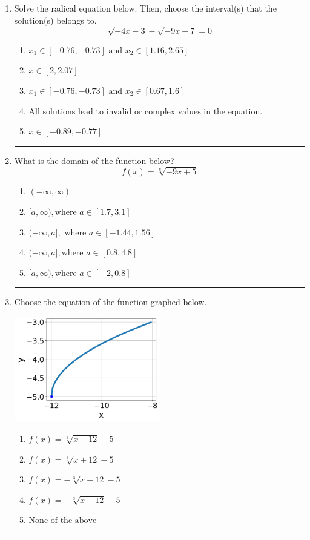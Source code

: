 \documentclass[14pt]{extbook}
\newcommand{\litem}[1]{\item#1\hspace*{-1cm}\rule{\textwidth}{0.4pt}}
\begin{document}
\begin{enumerate}
{\begin{enumerate}[label=\Alph*.]
\end{enumerate} }
\litem{
Solve the radical equation below. Then, choose the interval(s) that the solution(s) belongs to.\[ \sqrt{-4 x - 3} - \sqrt{-9 x + 7} = 0 \]\begin{enumerate}[label=\Alph*.]
\item \( x_1 \in [-0.76, -0.73] \text{ and } x_2 \in [1.16,2.65] \)
\item \( x \in [2,2.07] \)
\item \( x_1 \in [-0.76, -0.73] \text{ and } x_2 \in [0.67,1.6] \)
\item \( \text{All solutions lead to invalid or complex values in the equation.} \)
\item \( x \in [-0.89,-0.77] \)

\end{enumerate} }
\litem{
What is the domain of the function below?\[ f(x) = \sqrt[8]{-9 x + 5} \]\begin{enumerate}[label=\Alph*.]
\item \( (-\infty, \infty) \)
\item \( [a, \infty), \text{where } a \in [1.7, 3.1] \)
\item \( (-\infty, a], \text{ where } a \in [-1.44, 1.56] \)
\item \( (-\infty, a], \text{where } a \in [0.8, 4.8] \)
\item \( [a, \infty), \text{where } a \in [-2, 0.8] \)

\end{enumerate} }
\litem{
Choose the equation of the function graphed below.
\begin{center}
    \includegraphics[width=0.5\textwidth]{../Figures/radicalGraphToEquationCopyB.png}
\end{center}
\begin{enumerate}[label=\Alph*.]
\item \( f(x) = \sqrt[3]{x - 12} - 5 \)
\item \( f(x) = \sqrt[3]{x + 12} - 5 \)
\item \( f(x) = - \sqrt[3]{x - 12} - 5 \)
\item \( f(x) = - \sqrt[3]{x + 12} - 5 \)
\item \( \text{None of the above} \)


\end{enumerate}}
\end{enumerate}
\end{document}
